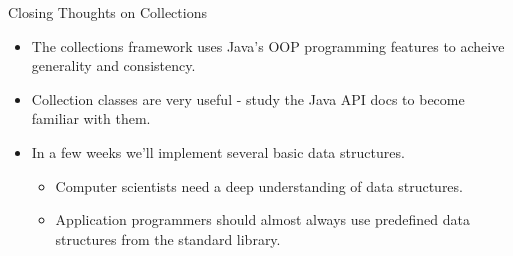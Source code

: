 \documentclass{beamer}
\begin{document}
\begin{frame}[fragile]{Closing Thoughts on Collections}


\begin{itemize}
\item The collections framework uses Java's OOP programming features to acheive generality and consistency.
\item Collection classes are very useful - study the Java API docs to become familiar with them.
\item In a few weeks we'll implement several basic data structures.
\begin{itemize}
\item Computer scientists need a deep understanding of data structures.
\item Application programmers should almost always use predefined data structures from the standard library.
\end{itemize}
\end{itemize}


\end{frame}








\end{document}
